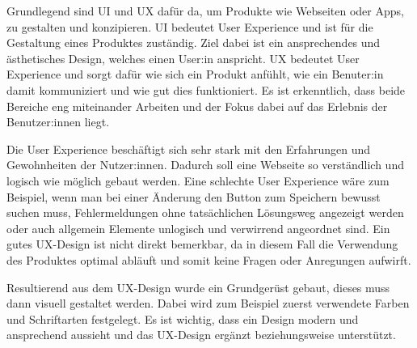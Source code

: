 Grundlegend sind UI und UX dafür da, um Produkte wie Webseiten oder Apps, zu gestalten und konzipieren. UI bedeutet User Experience und ist für die Gestaltung eines Produktes zuständig. Ziel dabei ist ein ansprechendes und ästhetisches Design, welches einen User:in anspricht. UX bedeutet User Experience und sorgt dafür wie sich ein Produkt anfühlt, wie ein Benuter:in damit kommuniziert und wie gut dies funktioniert. Es ist erkenntlich, dass beide Bereiche eng miteinander Arbeiten und der Fokus dabei auf das Erlebnis der Benutzer:innen liegt.

Die User Experience beschäftigt sich sehr stark mit den Erfahrungen und Gewohnheiten der Nutzer:innen. Dadurch soll eine Webseite so verständlich und logisch wie möglich gebaut werden. Eine schlechte User Experience wäre zum Beispiel, wenn man bei einer Änderung den Button zum Speichern bewusst suchen muss, Fehlermeldungen ohne tatsächlichen Lösungsweg angezeigt werden oder auch allgemein Elemente unlogisch und verwirrend angeordnet sind. Ein gutes UX-Design ist nicht direkt bemerkbar, da in diesem Fall die Verwendung des Produktes optimal abläuft und somit keine Fragen oder Anregungen aufwirft.

Resultierend aus dem UX-Design wurde ein Grundgerüst gebaut, dieses muss dann visuell gestaltet werden. Dabei wird zum Beispiel zuerst verwendete Farben und Schriftarten festgelegt. Es ist wichtig, dass ein Design modern und ansprechend aussieht und das UX-Design ergänzt beziehungsweise unterstützt.